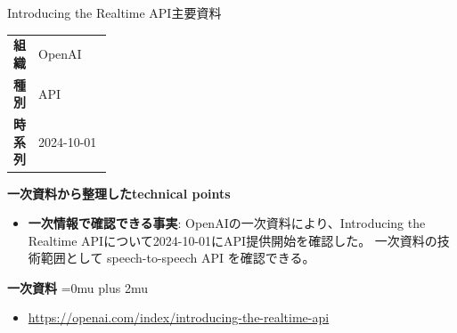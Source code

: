 \begin{technicalnote}{Introducing the Realtime API}{主要資料}
\begingroup
\begin{tabularx}{\linewidth}{@{}>{\bfseries}p{0.22\linewidth}X@{}}
組織 & OpenAI \\
種別 & API \\
時系列 & 2024-10-01 \\
\end{tabularx}
\smallskip
{\bfseries 一次資料から整理したtechnical points}
\begin{itemize}[leftmargin=1.5em,itemsep=0.35em]
\item \textbf{一次情報で確認できる事実}: OpenAIの一次資料により、Introducing the Realtime APIについて2024-10-01にAPI提供開始を確認した。 一次資料の技術範囲として speech-to-speech API を確認できる。
\end{itemize}
\begin{minipage}{\linewidth}
\begin{samepage}
{\bfseries 一次資料}
\begingroup\sloppy
\Urlmuskip=0mu plus 2mu\relax
\begin{itemize}[leftmargin=1.5em,itemsep=0.25em]
\item {\scriptsize\url{https://openai.com/index/introducing-the-realtime-api}}
\end{itemize}
\endgroup
\end{samepage}
\end{minipage}
\endgroup
\end{technicalnote}
\medskip

